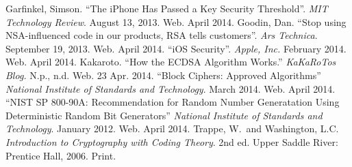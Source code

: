 \begin{thebibliography}{1}
 Garfinkel, Simson. ``The iPhone Has Passed a Key Security Threshold''. \textit{MIT Technology Review}. August 13, 2013. Web. April 2014.
 Goodin, Dan. ``Stop using NSA-influenced code in our products, RSA tells customers''. \textit{Ars Technica}. September 19, 2013. Web. April 2014.
 ``iOS Security''. \textit{Apple, Inc.} February 2014. Web. April 2014.
 Kakaroto. ``How the ECDSA Algorithm Works.'' \textit{KaKaRoTos Blog.} N.p., n.d. Web. 23 Apr. 2014.
 ``Block Ciphers: Approved Algorithms'' \textit{National Institute of Standards and Technology}. March 2014. Web. April 2014.
 ``NIST SP 800-90A: Recommendation for Random Number Generatation Using Deterministic Random Bit Generators'' \textit{National Institute of Standards and Technology}. January 2012. Web. April 2014.
 Trappe, W.\ and Washington, L.C. \textit{Introduction to Cryptography with Coding Theory}. 2nd ed. Upper Saddle River: Prentice Hall, 2006. Print.
\end{thebibliography}
